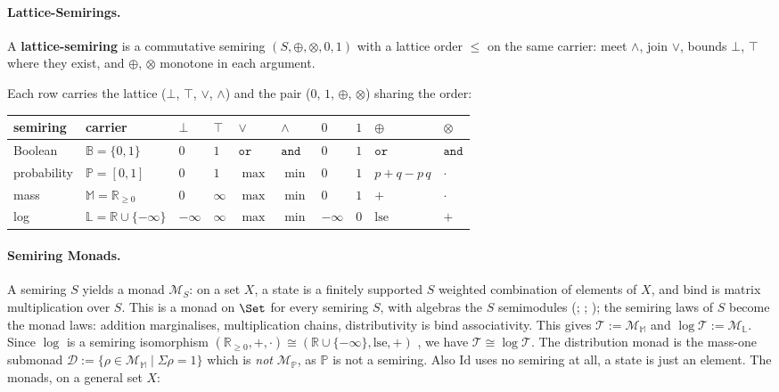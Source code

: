 \documentclass[anon]{../../journal-templates/NeSy26/nesy2026} %
\begin{document}
  \paragraph{Lattice-Semirings.}
\begin{definition}
A \textbf{lattice-semiring} is a commutative semiring
$(S, \oplus, \otimes, 0, 1)$ with a lattice order $\le$ on the same
carrier: meet $\wedge$, join $\vee$, bounds $\bot$, $\top$ where they
exist, and $\oplus$, $\otimes$ monotone in each argument.
\end{definition}
\noindent
Each row
carries the lattice ($\bot$, $\top$, $\vee$, $\wedge$) and the pair
($0$, $1$, $\oplus$, $\otimes$) sharing the order:

\begin{center}\small
\label{tab:semirings}
\begin{tabular}{@{}ll|llll|llll@{}}
semiring & carrier & $\bot$ & $\top$ & $\vee$ & $\wedge$ & $0$ & $1$ & $\oplus$ & $\otimes$ \\
\hline
Boolean & $\mathbb B = \{0,1\}$ & $0$ & $1$ & $\mathtt{or}$ & $\mathtt{and}$ & $0$ & $1$ & $\mathtt{or}$ & $\mathtt{and}$ \\[2pt]
probability & $\mathbb P = [0,1]$ & $0$ & $1$ & $\max$ & $\min$ & $0$ & $1$ & $p {+} q {-} p\,q$ & $\cdot$ \\[2pt]
mass & $\mathbb M = \mathbb R_{\ge 0}$ & $0$ & $\infty$ & $\max$ & $\min$ & $0$ & $1$ & $+$ & $\cdot$ \\[2pt]
log & $\mathbb L = \mathbb R \cup \{-\infty\}$ & $-\infty$ & $\infty$ & $\max$ & $\min$ & $-\infty$ & $0$ & $\mathrm{lse}$ & $+$ \\
\end{tabular}
\end{center}

\paragraph{Semiring Monads.} A
semiring $S$ yields a monad $\mathcal M_S$: on a set $X$, a state is a
finitely supported $S$ weighted combination of elements of $X$, and bind
is matrix multiplication over $S$. This is a monad on $\Set$ for every
semiring $S$, with algebras the $S$ semimodules
(\citealp[Lemma~5.1.5]{jacobsIntroductionCoalgebra2016};
\citealp[Ex.~2.2]{reggioCodensity2020};
\citealp{altenkirchMonadsNotEndofunctors2015}); the semiring laws of $S$
become the monad laws: addition marginalises, multiplication chains,
distributivity is bind associativity. This gives
$\mathcal T := \mathcal M_{\mathbb M}$ and
$\log\mathcal T := \mathcal M_{\mathbb L}$.  Since $\log$ is a semiring isomorphism
$(\mathbb R_{\ge 0}, +, \cdot) \cong
(\mathbb R \cup \{-\infty\}, \mathrm{lse}, +)$
\citep{mohriWeightedAutomata2009}, we have
$\mathcal T \cong \log\mathcal T$. The distribution monad is the
mass-one submonad $\mathcal D := \{\rho \in \mathcal M_{\mathbb M} \mid
\Sigma\rho = 1\}$ which is \emph{not} $\mathcal M_{\mathbb P}$, as $\mathbb P$ is
not a semiring. Also
$\mathrm{Id}$ uses no semiring at all, a state is just an element. The monads, on a general set $X$:
\end{document}
